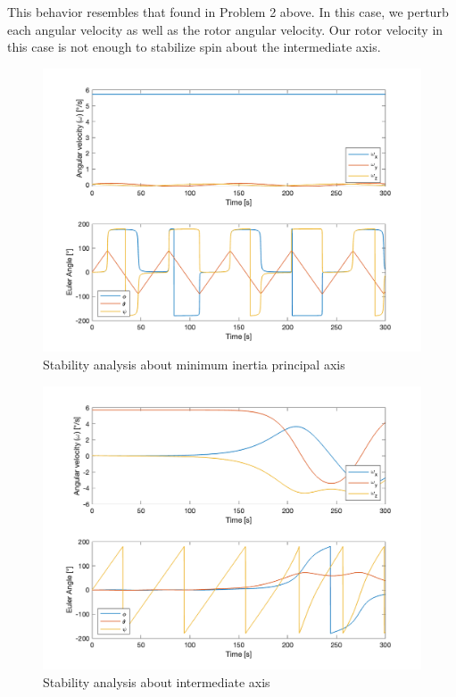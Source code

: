 This behavior resembles that found in Problem 2 above. In this case, we perturb each angular velocity as well as the rotor angular velocity. Our rotor velocity in this case is not enough to stabilize spin about the intermediate axis.

\begin{figure}[H]
\centering
\includegraphics[scale=0.6]{Images/ps4_problem3c_x.png}
\caption{Stability analysis about minimum inertia principal axis}
\label{fig:ps4_problem3c_x.png}
\end{figure}

\begin{figure}[H]
\centering
\includegraphics[scale=0.6]{Images/ps4_problem3c_y.png}
\caption{Stability analysis about intermediate axis}
\label{fig:ps4_problem3c_y.png}
\end{figure}

